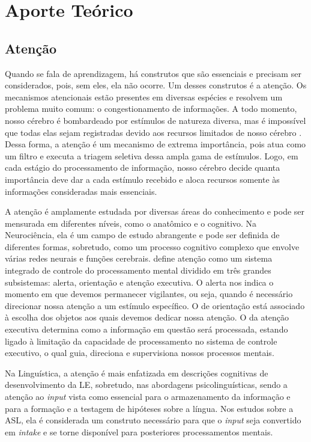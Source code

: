 \section{Aporte Teórico}\label{sec-aporteteo}

\subsection{Atenção}\label{sec-atencao}

Quando se fala de aprendizagem, há construtos que são essenciais e precisam ser
considerados, pois, sem eles, ela não ocorre. Um desses construtos é a atenção.
Os mecanismos atencionais estão presentes em diversas espécies e resolvem um
problema muito comum: o congestionamento de informações. A todo momento, nosso
cérebro é bombardeado por estímulos de natureza diversa, mas é impossível que
todas elas sejam registradas devido aos recursos limitados de nosso cérebro
\cite{dehaene2022,james1890principles,lima2005,posner1990}. Dessa forma, a atenção é um
mecanismo de extrema importância, pois atua como um filtro e executa a triagem
seletiva dessa ampla gama de estímulos. Logo, em cada estágio do processamento
de informação, nosso cérebro decide quanta importância deve dar a cada estímulo
recebido e aloca recursos somente às informações consideradas mais essenciais.

A atenção é amplamente estudada por diversas áreas do conhecimento e pode ser
mensurada em diferentes níveis, como o anatômico e o cognitivo. Na
Neurociência, ela é um campo de estudo abrangente e pode ser definida de
diferentes formas, sobretudo, como um processo cognitivo complexo que envolve
várias redes neurais e funções cerebrais. \textcite{posner1971,posner1990}
define atenção como um sistema integrado de controle do processamento mental
dividido em três grandes subsistemas: alerta, orientação e atenção executiva. O
alerta nos indica o momento em que devemos permanecer vigilantes, ou seja,
quando é necessário direcionar nossa atenção a um estímulo específico. O de
orientação está associado à escolha dos objetos aos quais devemos dedicar nossa
atenção. O da atenção executiva determina como a informação em questão será
processada, estando ligado à limitação da capacidade de processamento no
sistema de controle executivo, o qual guia, direciona e supervisiona nossos
processos mentais.

Na Linguística, a atenção é mais enfatizada em descrições cognitivas de
desenvolvimento da LE, sobretudo, nas abordagens psicolinguísticas,
sendo a atenção ao \emph{input} vista como essencial para o
armazenamento da informação e para a formação e a testagem de hipóteses
sobre a língua. Nos estudos sobre a ASL, ela é considerada um construto
necessário para que o \emph{input} seja convertido em \emph{intake} e se
torne disponível para posteriores processamentos mentais.

